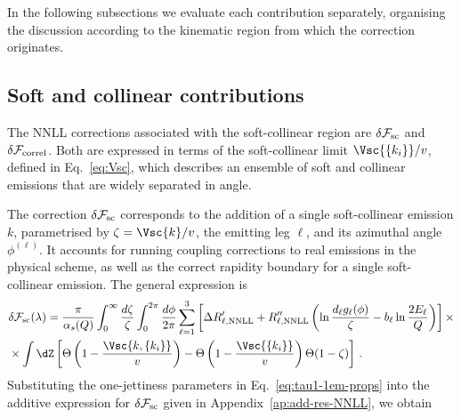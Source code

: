 In the following subsections we evaluate each contribution separately,
organising the discussion according to the kinematic region from which
the correction originates.
 
\subsection{Soft and collinear contributions}
\label{sec:sc-contributions}

The NNLL corrections associated with the soft-collinear region are
$\delta \mathcal{F}_{\rm sc}$ and $\delta \mathcal{F}_{\rm correl}$. 
Both are expressed in terms of the
soft-collinear limit $\Vsc{\{k_i\}}/v$, defined in Eq.~\eqref{eq:Vsc}, which describes an
ensemble of soft and collinear emissions that are widely separated in
angle.

The correction $\delta\mathcal{F}_{\rm sc}$ corresponds to the addition
of a single soft-collinear emission $k$, parametrised by $\zeta=\Vsc{k}/v$, 
the emitting leg $\ell$, and its azimuthal angle $\phi^{(\ell)}$.
It accounts for running coupling corrections to real emissions in the physical scheme,
as well as the correct rapidity boundary for a single soft-collinear emission. 
The general expression is 
\begin{equation}
\begin{aligned}
	\label{eq:dFsc-general}
	&\delta\mathcal{F}_{\mathrm{sc}}(\lambda)=\frac{\pi}{\alpha_s(Q)}\int_0^\infty\frac{d\zeta}{\zeta}\int_0^{2\pi}\frac{d\phi}{2\pi}\sum_{\ell=1}^3\left[\Delta R'_{\ell,\mathrm{NNLL}}+R''_{\ell,\mathrm{NNLL}}\left(\ln\frac{d_\ell g_\ell(\phi)}{\zeta}-b_\ell\ln\frac{2E_\ell}{Q}\right)\right]\times 
	 \\ &\times \int \dZ  \left[\Theta\left(1-\frac{\Vsc{k,\{k_i\}}}{v}\right)
       -\Theta\left(1-\frac{\Vsc{\{k_i\}}}{v}\right)\Theta(1-\zeta)
     \right]\,.
    \end{aligned}
\end{equation}
Substituting the one-jettiness parameters in
Eq.~\eqref{eq:tau1-1em-props} into the additive expression for
$\delta\mathcal{F}_{\rm sc}$ given in
Appendix~\ref{ap:add-res-NNLL}, we obtain

